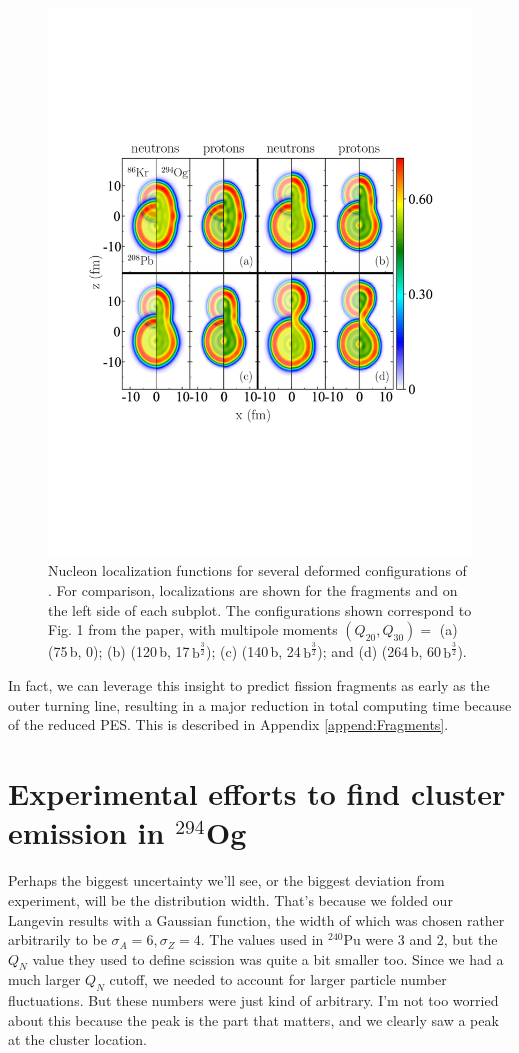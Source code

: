 \begin{figure}
	\centering
	\includegraphics[width=0.9\linewidth]{TeX_files/294Og_locali}
	\caption[Nucleon localization visualization of $^{294}$Og prefragment formation.]{Nucleon localization functions for several deformed configurations of {\Og}. For comparison, localizations are shown for the fragments {\Pb} and {\Kr} on the left side of each subplot. The configurations shown correspond to Fig. 1 from the paper, with multipole moments $(Q_{20}, Q_{30})=$ (a) (75\,b, 0); (b) (120\,b, 17\,$\mathrm{b}^\frac{3}{2}$); (c) (140\,b, 24\,$\mathrm{b}^\frac{3}{2}$); and (d) (264\,b, 60\,$\mathrm{b}^\frac{3}{2}$).}
	\label{fig:294oglocali}
\end{figure}

In fact, we can leverage this insight to predict fission fragments as early as the outer turning line, resulting in a major reduction in total computing time because of the reduced PES. This is described in Appendix \ref{append:Fragments}.


\section{Experimental efforts to find cluster emission in $^{294}$Og}
Perhaps the biggest uncertainty we'll see, or the biggest deviation from experiment, will be the distribution width. That's because we folded our Langevin results with a Gaussian function, the width of which was chosen rather arbitrarily to be $\sigma_A=6, \sigma_Z=4$. The values used in $^{240}$Pu were 3 and 2, but the $Q_N$ value they used to define scission was quite a bit smaller too. Since we had a much larger $Q_N$ cutoff, we needed to account for larger particle number fluctuations. But these numbers were just kind of arbitrary. I'm not too worried about this because the peak is the part that matters, and we clearly saw a peak at the cluster location.

